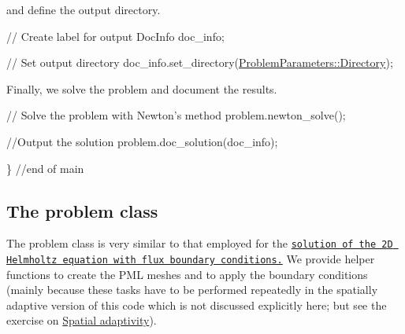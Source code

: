and define the output directory.

 
\begin{DoxyCodeInclude}
 \textcolor{comment}{// Create label for output}
 DocInfo doc\_info;

 \textcolor{comment}{// Set output directory}
 doc\_info.set\_directory(\hyperlink{namespaceProblemParameters_a9df0f1728e8e7e53dcca84385ae9a031}{ProblemParameters::Directory});

\end{DoxyCodeInclude}


Finally, we solve the problem and document the results.

 
\begin{DoxyCodeInclude}
\textcolor{comment}{// Solve the problem with Newton's method}
problem.newton\_solve();

\end{DoxyCodeInclude}



\begin{DoxyCodeInclude}
 \textcolor{comment}{//Output the solution}
 problem.doc\_solution(doc\_info);


\} \textcolor{comment}{//end of main}

\end{DoxyCodeInclude}




\hypertarget{index_prb_clss}{}\subsection{The problem class}\label{index_prb_clss}
The problem class is very similar to that employed for the \href{../../../helmholtz/scattering/html/index.html}{\tt solution of the 2D Helmholtz equation with flux boundary conditions.} We provide helper functions to create the P\+ML meshes and to apply the boundary conditions (mainly because these tasks have to be performed repeatedly in the spatially adaptive version of this code which is not discussed explicitly here; but see the exercise on \hyperlink{index_adaptivity}{Spatial adaptivity}).


